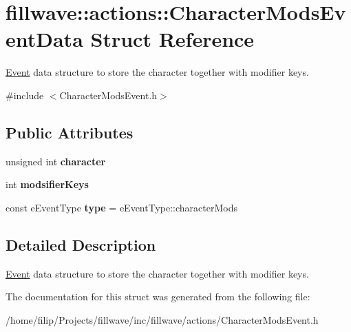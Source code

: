 \hypertarget{structfillwave_1_1actions_1_1CharacterModsEventData}{}\section{fillwave\+:\+:actions\+:\+:Character\+Mods\+Event\+Data Struct Reference}
\label{structfillwave_1_1actions_1_1CharacterModsEventData}


\hyperlink{classfillwave_1_1actions_1_1Event}{Event} data structure to store the character together with modifier keys.  




{\ttfamily \#include $<$Character\+Mods\+Event.\+h$>$}

\subsection*{Public Attributes}
\begin{DoxyCompactItemize}
\item 
\hypertarget{structfillwave_1_1actions_1_1CharacterModsEventData_a8694e8dc9f263e01e5f2cc81e0100d38}{}unsigned int {\bfseries character}\label{structfillwave_1_1actions_1_1CharacterModsEventData_a8694e8dc9f263e01e5f2cc81e0100d38}

\item 
\hypertarget{structfillwave_1_1actions_1_1CharacterModsEventData_a4cf040017ffcef283873071fdfbf4ea9}{}int {\bfseries modsifier\+Keys}\label{structfillwave_1_1actions_1_1CharacterModsEventData_a4cf040017ffcef283873071fdfbf4ea9}

\item 
\hypertarget{structfillwave_1_1actions_1_1CharacterModsEventData_a0562ffc2dfbb6848510ec9337a8f6fc7}{}const e\+Event\+Type {\bfseries type} = e\+Event\+Type\+::character\+Mods\label{structfillwave_1_1actions_1_1CharacterModsEventData_a0562ffc2dfbb6848510ec9337a8f6fc7}

\end{DoxyCompactItemize}


\subsection{Detailed Description}
\hyperlink{classfillwave_1_1actions_1_1Event}{Event} data structure to store the character together with modifier keys. 

The documentation for this struct was generated from the following file\+:\begin{DoxyCompactItemize}
\item 
/home/filip/\+Projects/fillwave/inc/fillwave/actions/Character\+Mods\+Event.\+h\end{DoxyCompactItemize}
